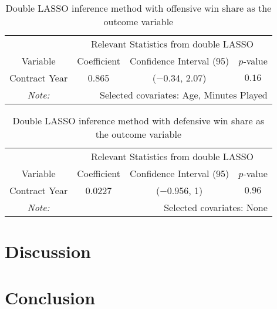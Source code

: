 \documentclass[12pt]{article}
\begin{document}
	\begin{table}[!htbp]
		\centering
		\caption{Double LASSO inference method with offensive win share as the outcome variable}
		\label{lassoows} 
		\begin{tabular}{*4c}
			\toprule
			& \multicolumn{3}{c}{Relevant Statistics from double LASSO} \\
			\cmidrule(lr){2-4}
			Variable & Coefficient  & Confidence Interval (95) & $p$-value \\
			\midrule
			Contract Year & 0.865       & ($-$0.34, 2.07) & $0.16$       \\
			\bottomrule
			\textit{Note:}  & \multicolumn{3}{r}{Selected covariates: Age, Minutes Played} \\
		\end{tabular}
	\end{table}
	
	\begin{table}[!htbp]
		\centering
		\caption{Double LASSO inference method with defensive win share as the outcome variable}
		\label{lassodws} 
		\begin{tabular}{*4c}
			\toprule
			& \multicolumn{3}{c}{Relevant Statistics from double LASSO} \\
			\cmidrule(lr){2-4}
			Variable & Coefficient  & Confidence Interval (95) & $p$-value \\
			\midrule
			Contract Year & 0.0227       & ($-$0.956, 1) & $0.96$       \\
			\bottomrule
			\textit{Note:}  & \multicolumn{3}{r}{Selected covariates: None} \\
		\end{tabular}
	\end{table}
	
	\section{Discussion} \label{sec:discussion}
	
	\section{Conclusion} \label{sec:conclusion}
\end{document}
